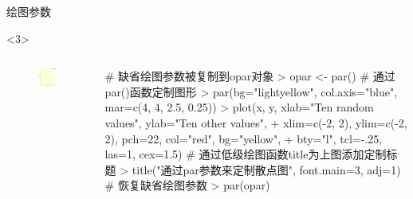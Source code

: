 \documentclass{beamerthemeMono}
\begin{document}
\begin{frame}[t,fragile]{\subsecname}{绘图参数}
\begin{overlayarea}{\textwidth}{\textheight}
\begin{onlyenv}<3>
\begin{columns}
        \begin{column}{.4\textwidth}
          \begin{figure}
            \centering
            \includegraphics[width=\columnwidth]{par.png}
          \end{figure}
        \end{column}

        \begin{column}{.6\textwidth}
 \centering
\begin{rcode}
# 缺省绘图参数被复制到opar对象
> opar <- par()
# 通过par()函数定制图形
> par(bg="lightyellow", col.axis="blue", mar=c(4, 4, 2.5, 0.25))
> plot(x, y, xlab="Ten random values", ylab="Ten other values",
+ xlim=c(-2, 2), ylim=c(-2, 2), pch=22, col="red", bg="yellow",
+ bty="l", tcl=-.25, las=1, cex=1.5)
# 通过低级绘图函数title为上图添加定制标题
> title("通过par参数来定制散点图", font.main=3, adj=1)
# 恢复缺省绘图参数
> par(opar)
\end{rcode}
        \end{column}
      \end{columns}
\end{onlyenv}
\end{overlayarea}  
\end{frame}
\end{document}
